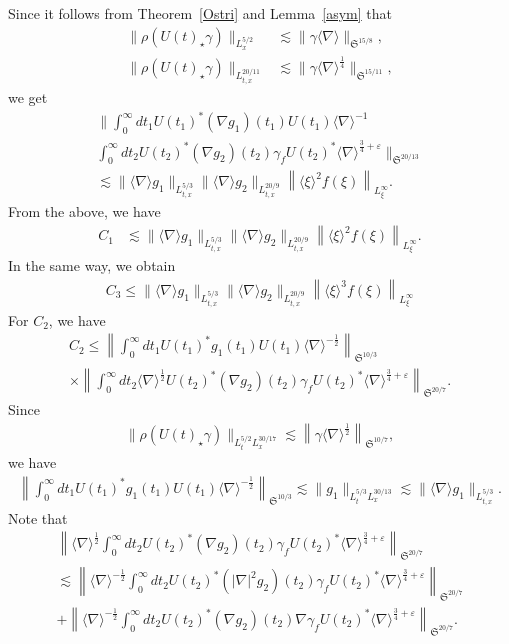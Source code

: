 \documentclass[10pt,a4paper]{amsart}
\providecommand{\No}[1]{\left\| #1 \right\|}
\newcommand{\FS}{\mathfrak{S}}
\newcommand{\ga}{\gamma}
\newcommand{\ep}{\varepsilon}
\newcommand{\rh}{\rho}
\renewcommand{\No}[1]{\left\| #1 \right\|}
\newcommand{\I}{\infty}
\newcommand{\sd}{\langle \nabla \rangle}
\newcommand{\sdi}{\sd^{-1}}
\newcommand{\lxr}{\langle \xi \rangle}
\newcommand{\tx}{{t,x}}
\newcommand{\st}{\star}
\newcommand{\ft}{{\frac{1}{4}}}
\newcommand{\fh}{\frac{3}{4}}
\newcommand{\tw}{\frac{1}{2}}
\newcommand{\na}{\nabla}
\newcommand{\ls}{\lesssim}
\begin{document}
Since it follows from Theorem~\ref{Ostri} and Lemma~\ref{asym} that
\begin{align}
\|\rh(U(t)_\st \ga)\|_{L^{5/2}_x} &\ls \|\ga \sd \|_{\FS^{15/8}}, \\
\|\rh(U(t)_\st \ga)\|_{L^{20/11}_\tx} &\ls \|\ga \sd^\ft\|_{\FS^{15/11}},
\end{align}
we get
\begin{multline}
\bigg\|\int_0^\I dt_1 U(t_1)^* (\na g_1)(t_1) U(t_1) \sdi \\
\int_0^\I dt_2 U(t_2)^* (\na g_2)(t_2)\ga_f U(t_2)^* \sd^{\fh+\ep} \bigg\|_{\FS^{20/13}} \\
\ls \|\sd g_1\|_{L^{5/3}_\tx} \|\sd g_2\|_{L^{20/9}_\tx}\left\|\lxr^2 f(\xi)\right\|_{L^\I_\xi}.
\end{multline}
From the above, we have
\begin{align}
C_1 &\ls \|\sd g_1\|_{L^{5/3}_\tx} \|\sd g_2\|_{L^{20/9}_\tx} \left\|\lxr^{2}f(\xi)\right\|_{L^\I_\xi}.
\end{align}
In the same way, we obtain
\begin{align}
C_3 \le \|\sd g_1\|_{L^{5/3}_\tx} \|\sd g_2\|_{L^{20/9}_\tx} \left\|\lxr^{3}f(\xi)\right\|_{L^\I_\xi}
\end{align}
For $C_2$, we have
\begin{multline}
C_2 \le
\No{
\int_0^\I dt_1 U(t_1)^* g_1(t_1) U(t_1) \sd^{-\tw} }_{\FS^{10/3}} \\
\times \No{\int_0^\I dt_2 \sd^{\tw} U(t_2)^* (\na g_2)(t_2)\ga_f U(t_2)^* \sd^{\fh+\ep} }_{\FS^{20/7}}.
\end{multline}
Since
\begin{align}
\|\rh(U(t)_\st \ga)\|_{L^{5/2}_t L^{30/17}_x} \ls \left\|\ga \sd^\tw\right\|_{\FS^{10/7}},
\end{align}
we have
\begin{align}
\No{
\int_0^\I dt_1 U(t_1)^* g_1(t_1) U(t_1) \sd^{-\tw} }_{\FS^{10/3}}
\ls \|g_1\|_{L^{5/3}_t L^{30/13}_x} \ls \|\sd g_1\|_{L^{5/3}_\tx}.
\end{align}
Note that
\begin{multline}
\No{\sd^\tw \int_0^\I dt_2 U(t_2)^* (\na g_2)(t_2)\ga_f U(t_2)^* \sd^{\fh+\ep} }_{\FS^{20/7}} \\
\ls \No{\sd^{-\tw} \int_0^\I dt_2 U(t_2)^* (|\na|^2 g_2)(t_2)\ga_f U(t_2)^* \sd^{\fh+\ep} }_{\FS^{20/7}} \\
 + \No{\sd^{-\tw} \int_0^\I dt_2 U(t_2)^* (\na g_2)(t_2)\na \ga_f U(t_2)^* \sd^{\fh+\ep} }_{\FS^{20/7}}.
\end{multline}
\end{document}
